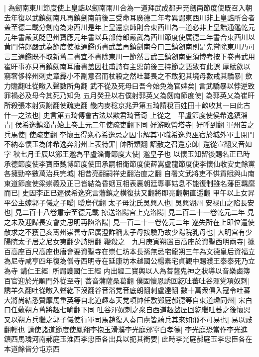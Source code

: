 |{
	為劒南東川節度使上皇誥以劒南兩川合為一道拜武成都尹充劒南節度使既召入朝去年復以武鎮劒南凡再鎮劍南前後三受命耳廣德二年考異謂東西川非上皇誥所合者盖至德二載分劍南為東西川是年上皇還京師則合東西川為一道必非上皇誥通鑑乾元元年書嚴武貶巴州寶應元年書以兵部侍郎嚴武為西川節度使廣德二年書合東西川以黄門侍郎嚴武為節度使據通鑑所書武盖再鎮劍南今曰三鎮劒南則是先嘗除東川乃可言三通鑑既不取新舊二書宜不書除東川一節然言武三鎮劒南更須博考按下卷書武用崔旰事亦只再鎮劒南耳唐書盖因杜甫詩有主恩前後三持節之語致有此誤}
厚賦歛以窮奢侈梓州刺史章彛小不副意召而杖殺之然吐蕃畏之不敢犯其境母數戒其驕暴|{
	歛力贍翻吐從暾入聲數所角翻}
武不從及死母曰吾今始免為官婢矣|{
	言武驕暴以悖逆致罪禍必及母今其死乃知免}
五月癸丑以右僕射郭英乂為劒南節度使|{
	為郭英乂為崔旰所殺張本射寅謝翻使疏吏翻}
畿内麥稔京兆尹第五琦請稅百姓田十畝收其一曰此古什一之法也|{
	史言第五琦傅會古法以欺君琦音奇}
上從之　平盧節度使侯希逸鎮淄青|{
	侯希逸鎮淄青始上卷上元二年使疏吏翻下同}
好游畋營塔寺|{
	好呼到翻}
軍州苦之兵馬使|{
	使疏吏翻}
李懷玉得衆心希逸忌之因事解其軍職希逸與巫宿於城外軍士閉門不納奉懷玉為帥希逸奔滑州上表待罪|{
	帥所類翻}
詔赦之召還京師|{
	還從宣翻又音如字}
秋七月壬辰以鄭王邈為平盧淄青節度大使|{
	邈皇子也}
以懷玉知留後賜名正已時承德節度使李寶臣魏博節度使田承嗣相衛節度使薛嵩盧龍節度使李懷仙收安史餘黨各擁勁卒數萬治兵完城|{
	相昔亮翻嗣祥史翻治直之翻}
自署文武將吏不供貢賦與山南東道節度使梁崇義及正已皆結為昏姻互相表裏朝廷專事姑息不能復制雖名藩臣羈縻而已|{
	史因李正已逐侯希逸究言藩鎮之横復扶又翻將即亮翻朝直遥翻}
甲午以上女昇平公主嫁郭子儀之子曖|{
	曖烏代翻}
太子母沈氏吳興人也|{
	吳興湖州}
安禄山之陷長安也|{
	見二百十八卷肅宗至德元載}
掠送洛陽宫上克洛陽|{
	見二百二十一卷乾元二年}
見之未及迎歸長安會史思明再陷洛陽|{
	見一百二十一卷乾元二年}
遂失所在上即位遣使散求之不獲己亥夀州崇善寺尼廣澄詐稱太子母按驗乃故少陽院乳母也|{
	大明宫有少陽院太子居之尼女夷翻少詩照翻}
鞭殺之　九月庚寅朔置百高座於資聖西明兩寺|{
	據百高座百尺高座也唐會要資聖寺在崇仁坊本長孫無忌宅龍朔三年為文德皇后資福立為尼寺咸亨四年復為僧寺西明寺在延康坊本越國公楊素宅貞觀中賜濮王泰泰死乃立為寺}
講仁王經|{
	所謂護國仁王經}
内出經二寶輿以人為菩薩鬼神之狀導以音樂鹵簿百官迎於光順門外從至寺|{
	菩音蒲薩桑葛翻}
僕固懷恩誘回紇吐蕃吐谷渾党項奴刺|{
	誘羊久翻吐從暾入聲紇下沒翻谷音浴党音底朗翻刺盧達翻}
數十萬衆俱入寇令吐蕃大將尚結悉贊摩馬重英等自北道趣奉天党項帥任敷鄭庭郝德等自東道趣同州|{
	宋白曰任敷朔方舊將趣七喻翻下同}
吐谷渾奴刺之衆自西道趣盩厔回紇繼吐蕃之後懷恩又以朔方兵繼之郭子儀使行軍司馬趙復入奏曰虜皆騎兵其來如飛不可易也|{
	易以䜴翻輕也}
請使諸道節度使鳳翔李抱玉滑濮李光庭邠寜白孝德|{
	李光庭恐當作李光進}
鎮西馬璘河南郝庭玉淮西李忠臣各出兵以扼其衝要|{
	此時李光庭郝庭玉李忠臣各在本道餘皆分屯京西}
